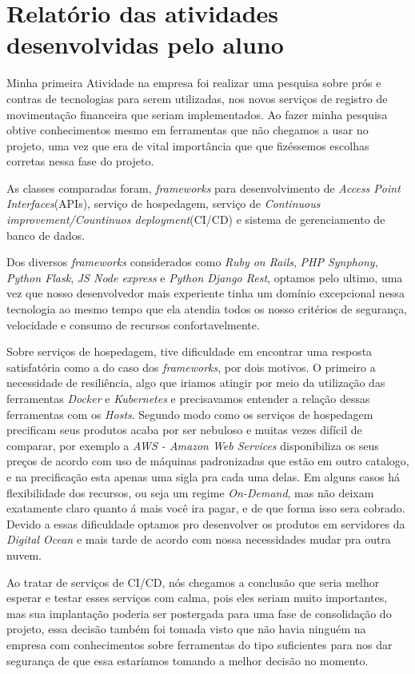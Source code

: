 \documentclass{ufscar}
\begin{document}
\section{Relatório das atividades desenvolvidas pelo aluno}
Minha primeira Atividade na empresa foi realizar uma pesquisa sobre prós e contras de tecnologias para serem utilizadas, nos novos serviços de registro de movimentação financeira que seriam implementados. Ao fazer minha pesquisa obtive conhecimentos mesmo em ferramentas que não chegamos a usar no projeto, uma vez que era de vital importância que que fizéssemos escolhas corretas nessa fase do projeto.

As classes comparadas foram, \textit{frameworks} para desenvolvimento de \textit{Access Point Interfaces}(APIs), serviço de hospedagem, serviço de \textit{Continuous improvement/Countinuos deployment}(CI/CD) e sistema de gerenciamento de banco de dados.

Dos diversos \textit{frameworks} considerados como \textit{Ruby on Rails}, \textit{PHP Synphony}, \textit{Python Flask}, \textit{JS Node express} e \textit{Python Django Rest}, optamos pelo ultimo, uma vez que nosso desenvolvedor mais experiente tinha um domínio excepcional nessa tecnologia ao mesmo tempo que ela atendia todos os nosso critérios de segurança, velocidade e consumo de recursos confortavelmente.

Sobre serviços de hospedagem, tive dificuldade em encontrar uma resposta satisfatória como a do caso dos \textit{frameworks}, por dois motivos. O primeiro a necessidade de resiliência, algo que iriamos atingir por meio da utilização das ferramentas \textit{Docker} e \textit{Kubernetes} e precisavamos entender a relação dessas ferramentas com os \textit{Hosts}. Segundo modo como os serviços de hospedagem precificam seus produtos acaba por ser nebuloso e muitas vezes difícil de comparar, por exemplo a \textit{AWS - Amazon Web Services} disponibiliza os seus preços de acordo com uso de máquinas padronizadas que estão em outro catalogo, e na precificação esta apenas uma sigla pra cada uma delas. Em alguns casos há flexibilidade dos recursos, ou seja um regime \textit{On-Demand}, mas não deixam exatamente claro quanto á mais você ira pagar, e de que forma isso sera cobrado. Devido a essas dificuldade optamos pro desenvolver os produtos em servidores da \textit{Digital Ocean} e mais tarde de acordo com nossa necessidades mudar pra outra nuvem.

Ao tratar de serviços de CI/CD, nós chegamos a conclusão que seria melhor esperar e testar esses serviços com calma, pois eles seriam muito importantes, mas sua implantação poderia ser postergada para uma fase de consolidação do projeto, essa decisão também foi tomada visto que não havia ninguém na empresa com conhecimentos sobre ferramentas do tipo suficientes para nos dar segurança de que essa estaríamos tomando a melhor decisão no momento.
\end{document}
